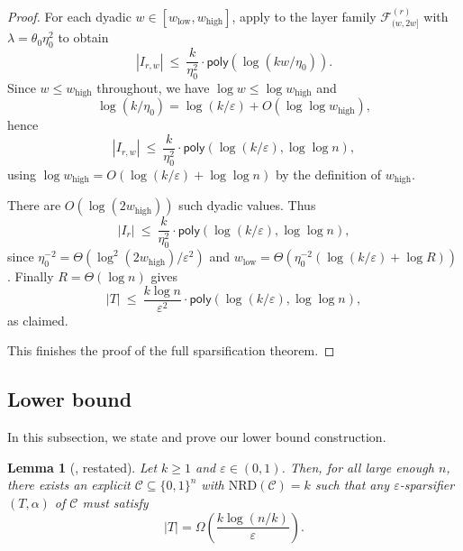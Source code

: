 \documentclass{article}
\newtheorem{lemma}[lemma]{Lemma}
\DeclareMathOperator{\high}{\mathrm{high}}
\DeclareMathOperator{\low}{\mathrm{low}}
\newcommand{\poly}{\mathsf{poly}}
\newcommand{\<}{\langle}
\renewcommand{\>}{\rangle}
\newcommand{\calC}{\mathcal{C}}
\newcommand{\calF}{\mathcal{F}}
\begin{document}
\begin{proof}
For each dyadic $w\in[w_{\low},w_{\high}]$, apply
 to the layer family
$\calF^{(r)}_{(w,2w]}$ with $\lambda = \theta_0 \eta_0^2$ to obtain
\[
|I_{r,w}|
\ \le\
\frac{k}{\eta_0^2}\cdot \poly\!\left(\log(kw/\eta_0)\right).
\]
Since $w\le w_{\high}$ throughout, we have $\log w\le \log w_{\high}$ and
\[
\log(k/\eta_0)=\log(k/\varepsilon)+O(\log\log w_{\high}),
\]
hence
\[
|I_{r,w}|
\ \le\
\frac{k}{\eta_0^2}\cdot \poly\!\left(\log(k/\varepsilon),\log\log n\right),
\]
using $\log w_{\high} = O(\log(k/\varepsilon)+\log\log n)$ by the definition of $w_{\high}$.

There are $O(\log(2w_{\high}))$ such dyadic values. Thus
\[
|I_r|
\ \le\
\frac{k}{\eta_0^2}\cdot \poly\!\left(\log(k/\varepsilon),\log\log n\right),
\]
since $\eta_0^{-2}=\Theta(\log^2(2w_{\high})/\varepsilon^2)$ and
$w_{\low}=\Theta(\eta_0^{-2}(\log(k/\varepsilon)+\log R))$.
Finally $R=\Theta(\log n)$ gives
\[
|T|
\ \le\
\frac{k\log n}{\varepsilon^2}\cdot \poly\!\left(\log(k/\varepsilon),\log\log n\right),
\]
as claimed.

This finishes the proof of the full sparsification theorem.
\end{proof}


\subsection{Lower bound}\label{sec:sparsification_lower_bound}
In this subsection, we state and prove our lower bound construction. 

\begin{lemma}[, restated]
Let $k \ge 1$ and $\varepsilon \in (0,1)$. Then, for all large enough $n$, there exists an explicit $\calC \subseteq \{0, 1\}^n$ with $\mathrm{NRD}(\calC)= k$ such that any $\varepsilon$-sparsifier $(T, \alpha)$ of $\calC$ must satisfy
    \[
    |T| =\Omega \left( \frac{k \log (n/k)}{\varepsilon} \right).
    \]
\end{lemma}
\end{document}
